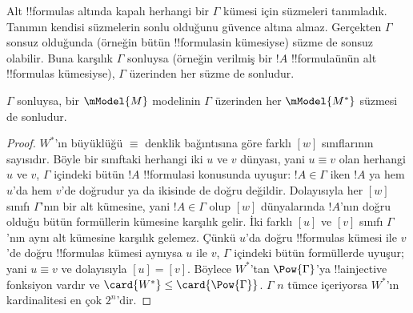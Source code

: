 \documentclass[../../../include/open-logic-section]{subfiles}
\begin{document}


Alt !!{formula}s altında kapalı herhangi bir $\Gamma$ kümesi için süzmeleri
tanımladık. Tanımın kendisi süzmelerin sonlu olduğunu güvence altına almaz.
Gerçekten $\Gamma$ sonsuz olduğunda (örneğin bütün !!{formula}s{}in kümesiyse)
süzme de sonsuz olabilir. Buna karşılık $\Gamma$ sonluysa (örneğin verilmiş
bir $!A$ !!{formula}{}ünün alt !!{formula}s kümesiyse), $\Gamma$ üzerinden
her süzme de sonludur.

\begin{prop}
  $\Gamma$ sonluysa, bir $\mModel{M}$ modelinin $\Gamma$ üzerinden her
  $\mModel{M^*}$ süzmesi de sonludur.
\end{prop}

\begin{proof}
  $W^*$'ın büyüklüğü $\equiv$ denklik bağıntısına göre farklı $[w]$
  sınıflarının sayısıdır. Böyle bir sınıftaki herhangi iki $u$ ve $v$ dünyası,
  yani $u\equiv v$ olan herhangi $u$ ve $v$, $\Gamma$ içindeki bütün $!A$
  !!{formula}s{}i konusunda uyuşur: $!A\in\Gamma$ iken $!A$ ya hem $u$'da
  hem $v$'de doğrudur ya da ikisinde de doğru değildir. Dolayısıyla her
  $[w]$ sınıfı $\Gamma$'nın bir alt kümesine, yani $!A\in\Gamma$ olup
  $[w]$ dünyalarında $!A$'nın doğru olduğu bütün formüllerin kümesine karşılık
  gelir. İki farklı
  $[u]$ ve $[v]$ sınıfı $\Gamma$'nın aynı alt kümesine karşılık gelemez.
  Çünkü $u$'da doğru !!{formula}s kümesi ile $v$'de doğru !!{formula}s
  kümesi aynıysa $u$ ile $v$, $\Gamma$ içindeki bütün formüllerde uyuşur;
  yani $u\equiv v$ ve dolayısıyla $[u]=[v]$. Böylece $W^*$'tan
  $\Pow{\Gamma}$'ya !!a{injective} fonksiyon vardır ve
  $\card{W^*}\leq\card{\Pow{\Gamma}}$. $\Gamma$ $n$ tümce içeriyorsa
  $W^*$'ın kardinalitesi en çok $2^n$'dir.
\end{proof}
\end{document}
